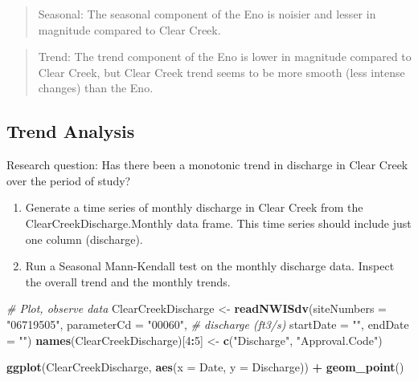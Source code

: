 \documentclass[]{article}
\newenvironment{Shaded}{\begin{snugshade}}{\end{snugshade}}
\newcommand{\CommentTok}[1]{\textcolor[rgb]{0.56,0.35,0.01}{\textit{#1}}}
\newcommand{\DataTypeTok}[1]{\textcolor[rgb]{0.13,0.29,0.53}{#1}}
\newcommand{\DecValTok}[1]{\textcolor[rgb]{0.00,0.00,0.81}{#1}}
\newcommand{\KeywordTok}[1]{\textcolor[rgb]{0.13,0.29,0.53}{\textbf{#1}}}
\newcommand{\NormalTok}[1]{#1}
\newcommand{\OperatorTok}[1]{\textcolor[rgb]{0.81,0.36,0.00}{\textbf{#1}}}
\newcommand{\StringTok}[1]{\textcolor[rgb]{0.31,0.60,0.02}{#1}}
\providecommand{\tightlist}{%
  \setlength{\itemsep}{0pt}\setlength{\parskip}{0pt}}
\begin{document}
\begin{quote}
Seasonal: The seasonal component of the Eno is noisier and lesser in
magnitude compared to Clear Creek.
\end{quote}

\begin{quote}
Trend: The trend component of the Eno is lower in magnitude compared to
Clear Creek, but Clear Creek trend seems to be more smooth (less intense
changes) than the Eno.
\end{quote}

\hypertarget{trend-analysis}{%
\subsection{Trend Analysis}\label{trend-analysis}}

Research question: Has there been a monotonic trend in discharge in
Clear Creek over the period of study?

\begin{enumerate}
\def\labelenumi{\arabic{enumi}.}
\setcounter{enumi}{10}
\tightlist
\item
  Generate a time series of monthly discharge in Clear Creek from the
  ClearCreekDischarge.Monthly data frame. This time series should
  include just one column (discharge).
\item
  Run a Seasonal Mann-Kendall test on the monthly discharge data.
  Inspect the overall trend and the monthly trends.
\end{enumerate}

\begin{Shaded}
\begin{Highlighting}[]
\CommentTok{# Plot, observe data}
\NormalTok{ClearCreekDischarge <-}\StringTok{ }\KeywordTok{readNWISdv}\NormalTok{(}\DataTypeTok{siteNumbers =} \StringTok{"06719505"}\NormalTok{,}
                     \DataTypeTok{parameterCd =} \StringTok{"00060"}\NormalTok{, }\CommentTok{# discharge (ft3/s)}
                     \DataTypeTok{startDate =} \StringTok{""}\NormalTok{,}
                     \DataTypeTok{endDate =} \StringTok{""}\NormalTok{)}
\KeywordTok{names}\NormalTok{(ClearCreekDischarge)[}\DecValTok{4}\OperatorTok{:}\DecValTok{5}\NormalTok{] <-}\StringTok{ }\KeywordTok{c}\NormalTok{(}\StringTok{"Discharge"}\NormalTok{, }\StringTok{"Approval.Code"}\NormalTok{)}

\KeywordTok{ggplot}\NormalTok{(ClearCreekDischarge, }\KeywordTok{aes}\NormalTok{(}\DataTypeTok{x =}\NormalTok{ Date, }\DataTypeTok{y =}\NormalTok{ Discharge)) }\OperatorTok{+}
\StringTok{  }\KeywordTok{geom_point}\NormalTok{()}
\end{Highlighting}
\end{Shaded}
\end{document}
